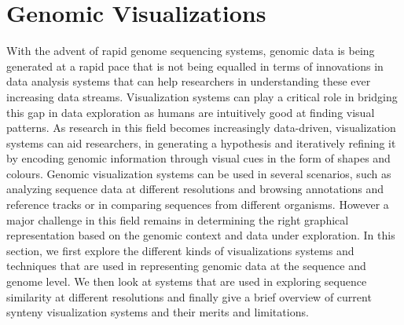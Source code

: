 \section{Genomic Visualizations} 
With the advent of rapid genome sequencing systems, genomic data is being generated at a rapid pace that is not being equalled in terms of innovations in data analysis systems that can help researchers in understanding these ever increasing data streams. Visualization systems can play a critical role in bridging this gap in data exploration as humans are intuitively good at finding visual patterns. As research in this field becomes increasingly data-driven, visualization systems can aid researchers, in generating a hypothesis and iteratively refining it by encoding genomic information through visual cues in the form of shapes and colours\cite{nusrat2019tasks}. Genomic visualization systems can be used in several scenarios, such as analyzing sequence data at different resolutions and browsing annotations and reference tracks or in comparing sequences from different organisms\cite{nielsen2010visualizing}. However a major challenge in this field remains in determining the right graphical representation based on the genomic context and data under exploration. In this section, we first explore the different kinds of visualizations systems and techniques that are used in representing genomic data at the sequence and genome level. We then look at systems that are used in exploring sequence similarity at different resolutions and finally give a brief overview of current synteny visualization systems and their merits and limitations.

